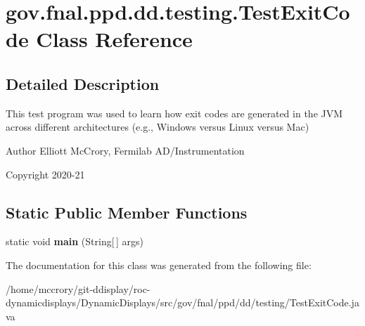 \hypertarget{classgov_1_1fnal_1_1ppd_1_1dd_1_1testing_1_1TestExitCode}{\section{gov.\-fnal.\-ppd.\-dd.\-testing.\-Test\-Exit\-Code Class Reference}
\label{classgov_1_1fnal_1_1ppd_1_1dd_1_1testing_1_1TestExitCode}
}


\subsection{Detailed Description}
This test program was used to learn how exit codes are generated in the J\-V\-M across different architectures (e.\-g., Windows versus Linux versus Mac)

\begin{DoxyAuthor}{Author}
Elliott Mc\-Crory, Fermilab A\-D/\-Instrumentation 
\end{DoxyAuthor}
\begin{DoxyCopyright}{Copyright}
2020-\/21 
\end{DoxyCopyright}
\subsection*{Static Public Member Functions}
\begin{DoxyCompactItemize}
\item 
\hypertarget{classgov_1_1fnal_1_1ppd_1_1dd_1_1testing_1_1TestExitCode_a679a4af30aa2930f66f19df4b0224e0c}{static void {\bfseries main} (String\mbox{[}$\,$\mbox{]} args)}\label{classgov_1_1fnal_1_1ppd_1_1dd_1_1testing_1_1TestExitCode_a679a4af30aa2930f66f19df4b0224e0c}

\end{DoxyCompactItemize}


The documentation for this class was generated from the following file\-:\begin{DoxyCompactItemize}
\item 
/home/mccrory/git-\/ddisplay/roc-\/dynamicdisplays/\-Dynamic\-Displays/src/gov/fnal/ppd/dd/testing/Test\-Exit\-Code.\-java\end{DoxyCompactItemize}
